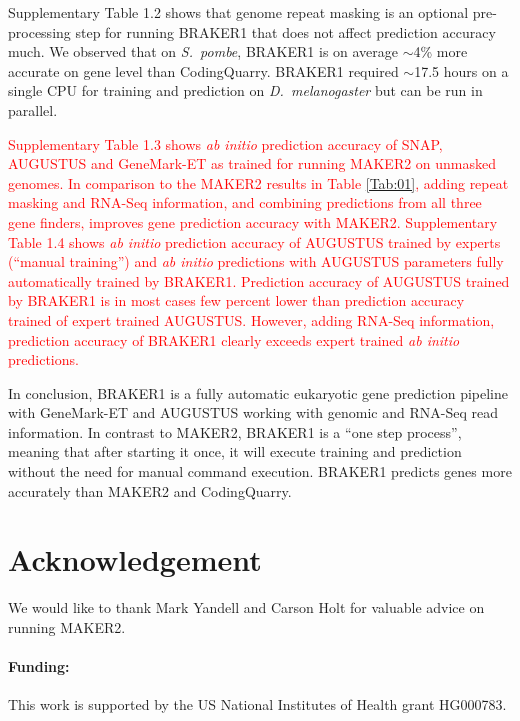 \documentclass[a4paper,10pt]{article}
\begin{document}
Supplementary Table 1.2 shows that genome repeat masking is an optional pre-processing step for running BRAKER1 that does not affect prediction accuracy much. We observed that on \textit{S.~pombe}, BRAKER1 is on average $\sim$4\% more accurate on gene level than CodingQuarry. %
BRAKER1 required $\sim$17.5 hours on a single CPU for training and prediction on \textit{D.~melanogaster} but can be run in parallel.

\textcolor{red}{Supplementary Table 1.3 shows \textit{ab initio} prediction accuracy of SNAP, AUGUSTUS and GeneMark-ET as trained for running MAKER2 on unmasked genomes. In comparison to the MAKER2 results in Table \ref{Tab:01}, adding repeat masking and RNA-Seq information, and combining predictions from all three gene finders, improves gene prediction accuracy with MAKER2. Supplementary Table 1.4 shows \textit{ab initio} prediction accuracy of AUGUSTUS trained by experts (``manual training'') and \textit{ab initio} predictions with AUGUSTUS parameters fully automatically trained by BRAKER1. Prediction accuracy of AUGUSTUS trained by BRAKER1 is in most cases few percent lower than prediction accuracy trained of expert trained AUGUSTUS. However, adding RNA-Seq information, prediction accuracy of BRAKER1 clearly exceeds expert trained \textit{ab initio} predictions.}

In conclusion, BRAKER1 is a fully automatic eukaryotic gene prediction pipeline with GeneMark-ET and AUGUSTUS working with genomic and RNA-Seq read information. In contrast to MAKER2, BRAKER1 is a ``one step process'', meaning that after starting it once, it will execute training and prediction without the need for manual command execution. BRAKER1 predicts genes more accurately than MAKER2 and CodingQuarry.

\section*{Acknowledgement}

We would like to thank Mark Yandell and Carson Holt for valuable advice on running MAKER2.

\paragraph{Funding:} This work is supported by the US National Institutes of Health grant HG000783.

%
%
%
%
%
%
%
%
%
\end{document}
